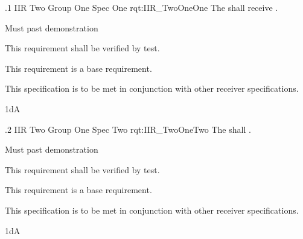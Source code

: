 \ONERQMTV
{\RqtNumberBase.1}
{IIR Two Group One Spec One}
{rqt:IIR_TwoOneOne}
{The \ThisSys{} shall receive \TBD.}
{
	\item [Phase 1] Must past demonstration
}
{This requirement shall be verified by test.}
{
	\item [N/A] This requirement is a base requirement.
}
{
	\item This specification is to be met in conjunction with other receiver specifications.
}
{1dA}

\ONERQMTV
{\RqtNumberBase.2}
{IIR Two Group One Spec Two}
{rqt:IIR_TwoOneTwo}
{The \ThisSys{} shall \TBD.}
{
	\item [Phase 1] Must past demonstration
}
{This requirement shall be verified by test.}
{
	\item [N/A] This requirement is a base requirement.
}
{
	\item This specification is to be met in conjunction with other receiver specifications.
}
{1dA}
